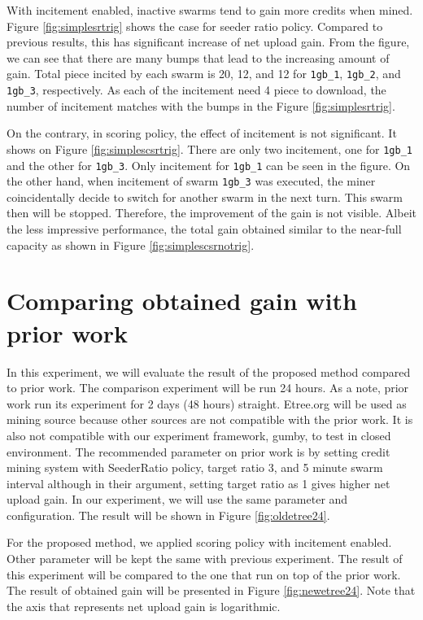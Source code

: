 With incitement enabled, inactive swarms tend to gain more credits when mined. Figure \ref{fig:simplesrtrig} shows the case for seeder ratio policy. Compared to previous results, this has significant increase of net upload gain. From the figure, we can see that there are many bumps that lead to the increasing amount of gain. Total piece incited by each swarm is 20, 12, and 12 for \texttt{1gb\_1}, \texttt{1gb\_2}, and \texttt{1gb\_3}, respectively. As each of the incitement need 4 piece to download, the number of incitement matches with the bumps in the Figure \ref{fig:simplesrtrig}. 

On the contrary, in scoring policy, the effect of incitement is not significant. It shows on Figure \ref{fig:simplescsrtrig}. There are only two incitement, one for \texttt{1gb\_1} and the other for \texttt{1gb\_3}. Only incitement for \texttt{1gb\_1} can be seen in the figure. On the other hand, when incitement of swarm \texttt{1gb\_3} was executed, the miner coincidentally decide to switch for another swarm in the next turn. This swarm then will be stopped. Therefore, the improvement of the gain is not visible. Albeit the less impressive performance, the total gain obtained similar to the near-full capacity as shown in Figure \ref{fig:simplescsrnotrig}.

\section{Comparing obtained gain with prior work}
In this experiment, we will evaluate the result of the proposed method compared to prior work. The comparison experiment will be run 24 hours. As a note, prior work run its experiment for 2 days (48 hours) straight. Etree.org will be used as mining source because other sources are not compatible with the prior work. It is also not compatible with our experiment framework, gumby, to test in closed environment. The recommended parameter on prior work is by setting credit mining system with SeederRatio policy, target ratio 3, and 5 minute swarm interval although in their argument, setting target ratio as 1 gives higher net upload gain. In our experiment, we will use the same parameter and configuration. The result will be shown in Figure \ref{fig:oldetree24}.

For the proposed method, we applied scoring policy with incitement enabled. Other parameter will be kept the same with previous experiment. The result of this experiment will be compared to the one that run on top of the prior work. The result of obtained gain will be presented in Figure \ref{fig:newetree24}. Note that the axis that represents net upload gain is logarithmic.

